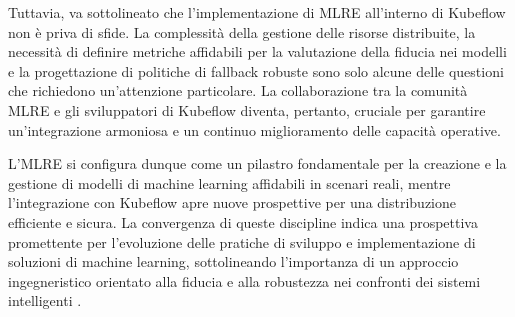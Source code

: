 Tuttavia, va sottolineato che l'implementazione di MLRE all'interno di Kubeflow non è priva di sfide. La complessità della gestione delle risorse distribuite, la necessità di definire metriche affidabili per la valutazione della fiducia nei modelli e la progettazione di politiche di fallback robuste sono solo alcune delle questioni che richiedono un'attenzione particolare. La collaborazione tra la comunità MLRE e gli sviluppatori di Kubeflow diventa, pertanto, cruciale per garantire un'integrazione armoniosa e un continuo miglioramento delle capacità operative.

L'MLRE si configura dunque come un pilastro fondamentale per la creazione e la gestione di modelli di machine learning affidabili in scenari reali, mentre l'integrazione con Kubeflow apre nuove prospettive per una distribuzione efficiente e sicura. La convergenza di queste discipline indica una prospettiva promettente per l'evoluzione delle pratiche di sviluppo e implementazione di soluzioni di machine learning, sottolineando l'importanza di un approccio ingegneristico orientato alla fiducia e alla robustezza nei confronti dei sistemi intelligenti \cite{MLRE_Kubeflow_integration}.
